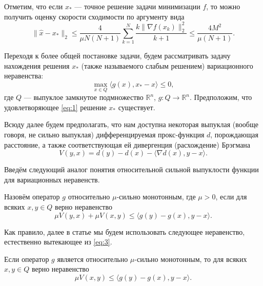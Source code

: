     Отметим, что если $x_*$ --- точное решение задачи минимизации $f$, то можно получить оценку скорости сходимости по аргументу вида
    \begin{equation} \label{arg_est}
        \|\widehat{x} - x_*\|_2 \leq \frac{4}{\mu N (N+1)} \sum_{k=1}^{N} \frac{k \|\nabla f(x_k)\|_2^2}{k+1} \leq \frac{4M^2}{\mu(N+1)}.
    \end{equation}

    Переходя к более общей постановке задачи, будем рассматривать задачу нахождения решения $x_*$ (также называемого слабым решением) вариационного неравенства: 
    \begin{equation}\label{eq:1}
    \max_{x \in Q} \langle g(x), x_* - x \rangle \leq 0,
    \end{equation}
    где $Q$ --- выпуклое замкнутое подмножество $\mathbb{R}^n$,
    $g: Q \longrightarrow \mathbb{R}^n$. Предположим, что удовлетворяющее \eqref{eq:1} решение $x_*$ существует.

    Всюду далее будем предполагать, что нам доступна некоторая выпуклая (вообще говоря, не сильно выпуклая) дифференцируемая прокс-функция $d$, порождающая расстояние, а также соответствующая ей дивергенция (расхождение) Брэгмана \cite{Bauschke}
    \begin{equation}\label{Brg_form}
    V(y, x) = d(y) - d(x) - \langle \nabla d(x), y - x \rangle.
    \end{equation}

    Введём следующий аналог понятия относительной сильной выпуклости функции \cite{Lu_Nesterov_2018} для вариационных неравенств.
    \begin{definition}\label{DefRelStrongMonot}
    Назовём оператор $g$ относительно $\mu$-сильно монотонным, где $\mu >0$, если для всяких $x, y \in Q$ верно неравенство
        \begin{equation}\label{eq:3}
             \mu V(y, x) + \mu V(x, y) \leq \langle g(y) - g(x), y - x \rangle.
         \end{equation}
    \end{definition}
    Как правило, далее в статье мы будем использовать следующее неравенство, естественно вытекающее из \eqref{eq:3}.
    \begin{remark}
    Если оператор $g$ является  относительно $\mu$-сильно монотонным, то для всяких $x, y \in Q$ верно неравенство
    $$
             \mu V(x, y) \leq \langle g(y) - g(x), y - x \rangle.
    $$
    \end{remark}
 \fi

